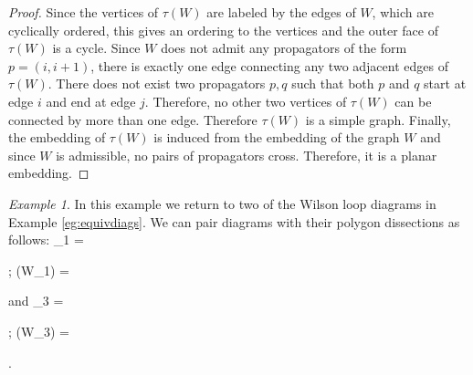 \documentclass[11pt]{article}
\newcommand{\drawWLD}[2]{

\pgfmathsetmacro{\n}{#1}
\pgfmathsetmacro{\radius}{#2}
\pgfmathsetmacro{\angle}{360/\n}
\draw (0,0) circle (\radius);
    \foreach \i in {1,2,...,\n} {
      \draw (\angle*\i:\radius) node {$\bullet$};
    }

}
\newcommand{\drawpolypart}[2]{
\pgfmathsetmacro{\n}{#1}
\pgfmathsetmacro{\radius}{#2}
\pgfmathsetmacro{\angle}{360/\n}
    \foreach \i in {1,2,...,\n} {
      \draw (\angle*\i+ \angle/2:\radius) node {$\bullet$};
     \pgfmathsetmacro{\x}{\angle*\i - \angle/2}
      \pgfmathsetmacro{\concave}{((\n-1.5)/\n)}
      \draw (\x:\radius cm) .. controls (\angle *\i: \concave* \radius cm) .. (\x + \angle:\radius cm);
    }

}
\newcommand{\drawprop}[4]{
\pgfmathsetmacro{\r}{#1}
\pgfmathsetmacro{\bumpr}{#2}
\pgfmathsetmacro{\s}{#3}
\pgfmathsetmacro{\bumps}{#4}
\pgfmathsetmacro{\perturbe}{\angle/\n}

\begin{scope}
\draw[propagator] (\angle*\r + \angle/2 + \bumpr*\perturbe:\radius) -- (\angle*\s + \angle/2 + \bumps*\perturbe:\radius);
\end{scope}
}
\newcommand{\drawchord}[2]{
\pgfmathsetmacro{\r}{#1}
\pgfmathsetmacro{\s}{#2}

\begin{scope}
\draw (\angle*\r + \angle/2:\radius) -- (\angle*\s + \angle/2:\radius);
\end{scope}
}
\newcommand{\drawnumbers}{
  \foreach \i in {1,2,...,\n} {
  \pgfmathsetmacro{\x}{\angle*\i}
  \draw (\x:\radius*1.15) node {\footnotesize \i};
}
}
\newcommand{\drawnumbersshift}{
  \foreach \i in {1,2,...,\n} {
  \pgfmathsetmacro{\x}{\angle*\i + \angle/2}
  \draw (\x:\radius*1.15) node {\footnotesize \i};
}
}
\def\bas #1\eas{\begin{align*} #1 \end{align*}}
\theoremstyle{remark}
\newtheorem{eg}[thm]{Example}
\theoremstyle{definition}
\begin{document}
\begin{proof}
Since the vertices of $\tau(W)$ are labeled by the edges of $W$, which are cyclically ordered, this gives an ordering to the vertices and the outer face of $\tau(W)$ is a cycle.  Since $W$ does not admit any propagators of the form $p = (i, i+1)$, there is exactly one edge connecting any two adjacent edges of $\tau(W)$. There does not exist two propagators $p,q$ such that both $p$ and $q$ start at edge $i$ and end at edge $j$. Therefore, no other two vertices of $\tau(W)$ can be connected by more than one edge.  Therefore $\tau(W)$ is a simple graph. Finally, the embedding of $\tau(W)$ is induced from the embedding of the graph $W$ and since $W$ is admissible, no pairs of propagators cross. Therefore, it is a planar embedding. 
 \end{proof}

\begin{eg}\label{WLDtopolygonpartition}
In this example we return to two of the Wilson loop diagrams in Example \ref{eg:equivdiags}. We can pair diagrams with their polygon dissections as follows:
\bas W_1 =  \quad; \quad
\tau(W_1) = 
\eas and
\bas W_3 = \quad; \quad
\tau(W_3) =  .
\eas

\end{eg}
\end{document}
